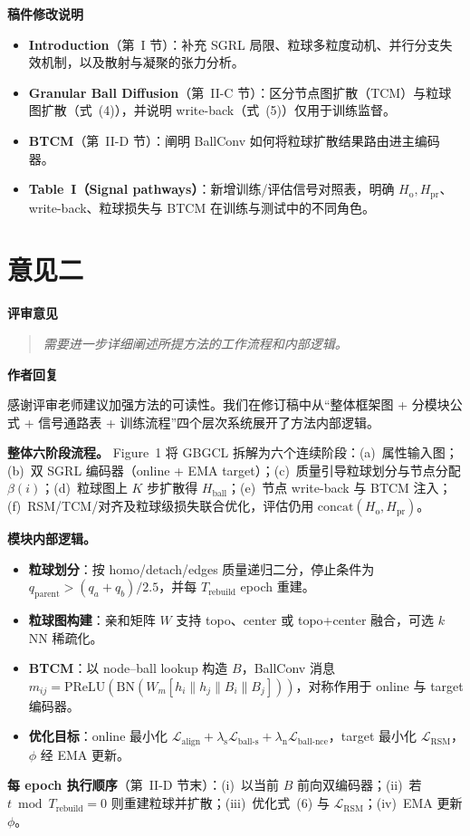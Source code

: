 \documentclass[11pt,a4paper]{ctexart}
\newcommand{\RC}[1]{%
  \par\vspace{0.6em}\noindent\textbf{评审意见}\par
  \begin{quote}\itshape #1\end{quote}}
\newcommand{\AR}[1]{%
  \par\vspace{0.4em}\noindent\textbf{作者回复}\par
  #1\par}
\newcommand{\MC}[1]{%
  \par\vspace{0.4em}\noindent\textbf{稿件修改说明}\par
  #1\par}
\begin{document}
\MC{%
\begin{itemize}
  \item \textbf{Introduction}（第~I 节）：补充 SGRL 局限、粒球多粒度动机、并行分支失效机制，以及散射与凝聚的张力分析。
  \item \textbf{Granular Ball Diffusion}（第~II-C 节）：区分节点图扩散（TCM）与粒球图扩散（式~(4)），并说明 write-back（式~(5)）仅用于训练监督。
  \item \textbf{BTCM}（第~II-D 节）：阐明 BallConv 如何将粒球扩散结果路由进主编码器。
  \item \textbf{Table~I（Signal pathways）}：新增训练/评估信号对照表，明确 $H_{\mathrm{o}},H_{\mathrm{pr}}$、write-back、粒球损失与 BTCM 在训练与测试中的不同角色。
\end{itemize}
}

\section*{意见二}

\RC{需要进一步详细阐述所提方法的工作流程和内部逻辑。}

\AR{感谢评审老师建议加强方法的可读性。我们在修订稿中从``整体框架图 + 分模块公式 + 信号通路表 + 训练流程''四个层次系统展开了方法内部逻辑。

\textbf{整体六阶段流程。}
Figure~1 将 GBGCL 拆解为六个连续阶段：(a)~属性输入图；(b)~双 SGRL 编码器（online + EMA target）；(c)~质量引导粒球划分与节点分配 $\beta(i)$；(d)~粒球图上 $K$ 步扩散得 $H_{\mathrm{ball}}$；(e)~节点 write-back 与 BTCM 注入；(f)~RSM/TCM/对齐及粒球级损失联合优化，评估仍用 $\mathrm{concat}(H_{\mathrm{o}},H_{\mathrm{pr}})$。

\textbf{模块内部逻辑。}
\begin{itemize}
  \item \textbf{粒球划分}：按 homo/detach/edges 质量递归二分，停止条件为 $q_{\mathrm{parent}} > (q_a+q_b)/2.5$，并每 $T_{\mathrm{rebuild}}$ epoch 重建。
  \item \textbf{粒球图构建}：亲和矩阵 $W$ 支持 topo、center 或 topo+center 融合，可选 $k$NN 稀疏化。
  \item \textbf{BTCM}：以 node--ball lookup 构造 $B$，BallConv 消息 $m_{ij}=\mathrm{PReLU}(\mathrm{BN}(W_m[h_i\|h_j\|B_i\|B_j]))$，对称作用于 online 与 target 编码器。
  \item \textbf{优化目标}：online 最小化 $\mathcal{L}_{\mathrm{align}}+\lambda_{\mathrm{s}}\mathcal{L}_{\mathrm{ball\mbox{-}s}}+\lambda_{\mathrm{n}}\mathcal{L}_{\mathrm{ball\mbox{-}nce}}$，target 最小化 $\mathcal{L}_{\mathrm{RSM}}$，$\phi$ 经 EMA 更新。
\end{itemize}

\textbf{每 epoch 执行顺序}（第~II-D 节末）：(i)~以当前 $B$ 前向双编码器；(ii)~若 $t\bmod T_{\mathrm{rebuild}}=0$ 则重建粒球并扩散；(iii)~优化式~(6) 与 $\mathcal{L}_{\mathrm{RSM}}$；(iv)~EMA 更新 $\phi$。}
\end{document}

